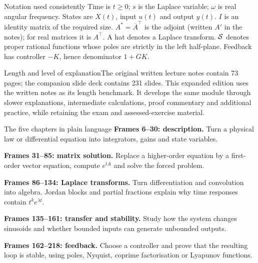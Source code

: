 \begin{concept}{Notation used consistently}
Time is $t\geq0$; $s$ is the Laplace variable; $\omega$ is real angular frequency. States are $X(t)$, input $u(t)$ and output $y(t)$. $I$ is an identity matrix of the required size. $A^*=\overline A^{\top}$ is the adjoint (written $A'$ in the notes); for real matrices it is $A^{\top}$. A hat denotes a Laplace transform. $\mathcal S$ denotes proper rational functions whose poles are strictly in the left half-plane. Feedback has controller \emph{$-K$}, hence denominator $1+GK$.
\end{concept}
\clearpage\begin{concept}{Length and level of explanation}The original written lecture notes contain 73 pages; the companion slide deck contains 231 slides. This expanded edition uses the written notes as its length benchmark. It develops the same module through slower explanations, intermediate calculations, proof commentary and additional practice, while retaining the exam and assessed-exercise material.\end{concept}
\tableofcontents\clearpage
{}
\begin{concept}{The five chapters in plain language}
\textbf{Frames 6--30: description.} Turn a physical law or differential equation into integrators, gains and state variables.

\textbf{Frames 31--85: matrix solution.} Replace a higher-order equation by a first-order vector equation, compute $e^{tA}$ and solve the forced problem.

\textbf{Frames 86--134: Laplace transforms.} Turn differentiation and convolution into algebra. Jordan blocks and partial fractions explain why time responses contain $t^ke^{\lambda t}$.

\textbf{Frames 135--161: transfer and stability.} Study how the system changes sinusoids and whether bounded inputs can generate unbounded outputs.

\textbf{Frames 162--218: feedback.} Choose a controller and prove that the resulting loop is stable, using poles, Nyquist, coprime factorisation or Lyapunov functions.
\end{concept}
